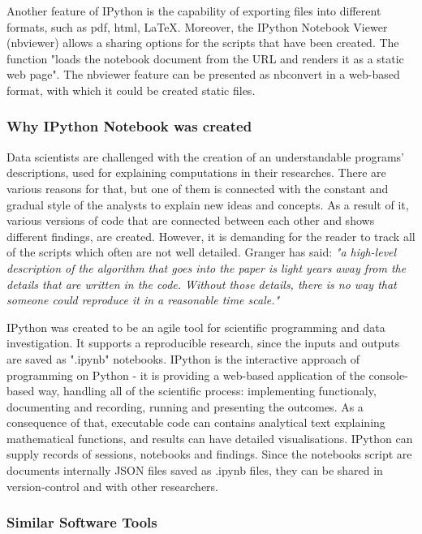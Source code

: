 Another feature of IPython is the capability of exporting files into different formats, such as pdf, html, LaTeX. Moreover, the IPython Notebook Viewer (nbviewer) allows a sharing options for the scripts that have been created. The function "loads the notebook document from the URL and renders it as a static web page".\cite{ipythonDef} The nbviewer feature can be presented as  nbconvert in a web-based format, with which it could be created static files. 

\subsubsection{Why IPython Notebook was created}

Data scientists are challenged with the creation of an understandable programs' descriptions, used for explaining computations in their researches. There are various reasons for that, but one of them is connected with the constant and gradual style of the analysts to explain new ideas and concepts. As a result of it, various versions of code that are connected between each other and shows different findings, are created. However, it is demanding for the reader to track all of the scripts which often are not well detailed. Granger has said: \textit{"a high-level description of the algorithm that goes into the paper is light years away from
the details that are written in the code. Without those details, there is no way that someone could reproduce it in a reasonable time scale."} \cite{shen2014interactive}

IPython was created to be an agile tool for scientific programming and data investigation. It supports a reproducible research, since the inputs and outputs are saved as ".ipynb" notebooks. IPython is the interactive approach of programming on Python - it is providing a web-based application of the console-based way, handling all of the scientific process: implementing functionaly, documenting and recording, running and presenting the outcomes. As a consequence of that, executable code can contains analytical text explaining mathematical functions, and results can have detailed visualisations. IPython can supply records of sessions, notebooks and findings. Since the notebooks script are documents internally JSON files saved as .ipynb files, they can be shared in version-control and with other researchers. \cite{ipythonFeatures}

\subsubsection{Similar Software Tools}

